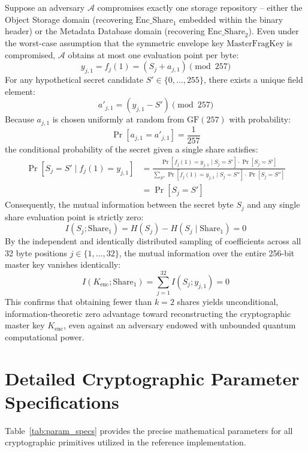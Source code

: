 \documentclass[sn-mathphys,Numbered]{sn-jnl}%
\theoremstyle{thmstyleone}%
\theoremstyle{thmstyletwo}%
\theoremstyle{thmstylethree}%
\begin{document}
\begin{appendices}
Suppose an adversary $\mathcal{A}$ compromises exactly one storage repository -- either the Object Storage domain (recovering $\text{Enc\_Share}_1$ embedded within the binary header) or the Metadata Database domain (recovering $\text{Enc\_Share}_2$). Even under the worst-case assumption that the symmetric envelope key $\text{MasterFragKey}$ is compromised, $\mathcal{A}$ obtains at most one evaluation point per byte:
\begin{equation}
y_{j,1} = f_j(1) = (S_j + a_{j,1}) \pmod{257}
\end{equation}
For any hypothetical secret candidate $S' \in \{0,\dots,255\}$, there exists a unique field element:
\begin{equation}
a'_{j,1} = (y_{j,1} - S') \pmod{257}
\end{equation}
Because $a_{j,1}$ is chosen uniformly at random from $\text{GF}(257)$ with probability:
\begin{equation}
\Pr[a_{j,1} = a'_{j,1}] = \frac{1}{257}
\end{equation}
the conditional probability of the secret given a single share satisfies:
\begin{equation}
\begin{split}
\Pr[S_j = S' \mid f_j(1) = y_{j,1}] &= \frac{\Pr[f_j(1) = y_{j,1} \mid S_j = S'] \cdot \Pr[S_j = S']}{\sum_{S''} \Pr[f_j(1) = y_{j,1} \mid S_j = S''] \cdot \Pr[S_j = S'']} \\
&= \Pr[S_j = S']
\end{split}
\end{equation}
Consequently, the mutual information between the secret byte $S_j$ and any single share evaluation point is strictly zero:
\begin{equation}
I(S_j; \text{Share}_1) = H(S_j) - H(S_j \mid \text{Share}_1) = 0
\end{equation}
By the independent and identically distributed sampling of coefficients across all 32 byte positions $j \in \{1,\dots,32\}$, the mutual information over the entire 256-bit master key vanishes identically:
\begin{equation}
I(K_{\text{enc}}; \text{Share}_1) = \sum_{j=1}^{32} I(S_j; y_{j,1}) = 0
\end{equation}
This confirms that obtaining fewer than $k=2$ shares yields unconditional, information-theoretic zero advantage toward reconstructing the cryptographic master key $K_{\text{enc}}$, even against an adversary endowed with unbounded quantum computational power.

\section{Detailed Cryptographic Parameter Specifications}\label{secA2}
Table~\ref{tab:param_specs} provides the precise mathematical parameters for all cryptographic primitives utilized in the reference implementation.


\end{appendices}
\end{document}
